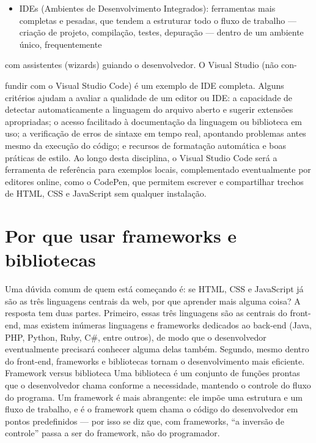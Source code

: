 \begin{itemize}
  \item IDEs (Ambientes de Desenvolvimento Integrados): ferramentas mais completas e pesadas, que tendem a estruturar todo o fluxo de trabalho — criação de projeto, compilação, testes, depuração — dentro de um ambiente único, frequentemente
\end{itemize}

com assistentes (wizards) guiando o desenvolvedor. O Visual Studio (não con-

\begin{infobox}{fundir com o Visual Studio Code) é um exemplo de IDE completa.}
Alguns critérios ajudam a avaliar a qualidade de um editor ou IDE: a capacidade de detectar automaticamente a linguagem do arquivo aberto e sugerir extensões apropriadas; o acesso facilitado à documentação da linguagem ou biblioteca em uso; a verificação de erros de sintaxe em tempo real, apontando problemas antes mesmo da execução do código; e recursos de formatação automática e boas práticas de estilo. Ao longo desta disciplina, o Visual Studio Code será a ferramenta de referência para exemplos locais, complementado eventualmente por editores online, como o CodePen, que permitem escrever e compartilhar trechos de HTML, CSS e JavaScript sem qualquer instalação.
\end{infobox}

\section{Por que usar frameworks e bibliotecas}

Uma dúvida comum de quem está começando é: se HTML, CSS e JavaScript já são as três linguagens centrais da web, por que aprender mais alguma coisa? A resposta tem duas partes. Primeiro, essas três linguagens são as centrais do front-end, mas existem inúmeras linguagens e frameworks dedicados ao back-end (Java, PHP, Python, Ruby, C\#, entre outros), de modo que o desenvolvedor eventualmente precisará conhecer alguma delas também. Segundo, mesmo dentro do front-end, frameworks e bibliotecas tornam o desenvolvimento mais eficiente. Framework versus biblioteca Uma biblioteca é um conjunto de funções prontas que o desenvolvedor chama conforme a necessidade, mantendo o controle do fluxo do programa. Um framework é mais abrangente: ele impõe uma estrutura e um fluxo de trabalho, e é o framework quem chama o código do desenvolvedor em pontos predefinidos — por isso se diz que, com frameworks, “a inversão de controle” passa a ser do framework, não do programador.


